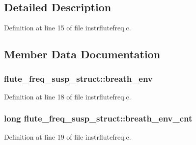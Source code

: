 \subsection{Detailed Description}


Definition at line 15 of file instrflutefreq.\+c.



\subsection{Member Data Documentation}
\subsubsection[{\texorpdfstring{breath\+\_\+env}{breath_env}}]{ flute\+\_\+freq\+\_\+susp\+\_\+struct\+::breath\+\_\+env}\hypertarget{structflute__freq__susp__struct_a2accb7945fd8fdc4dcb220340e0a7837}{}\label{structflute__freq__susp__struct_a2accb7945fd8fdc4dcb220340e0a7837}


Definition at line 18 of file instrflutefreq.\+c.

\subsubsection[{\texorpdfstring{breath\+\_\+env\+\_\+cnt}{breath_env_cnt}}]{\setlength{\rightskip}{0pt plus 5cm}long flute\+\_\+freq\+\_\+susp\+\_\+struct\+::breath\+\_\+env\+\_\+cnt}\hypertarget{structflute__freq__susp__struct_acf92b37d34c87dae733ccc1e730c71fb}{}\label{structflute__freq__susp__struct_acf92b37d34c87dae733ccc1e730c71fb}


Definition at line 19 of file instrflutefreq.\+c.

